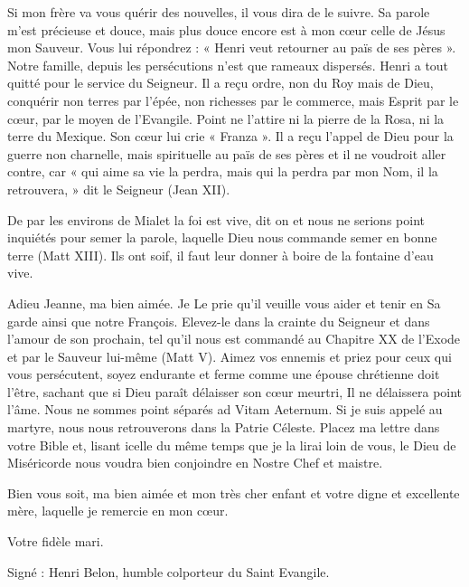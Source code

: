 {Si mon frère va vous quérir des nouvelles, il vous dira de le suivre. Sa parole m’est précieuse et douce, mais plus douce encore est à mon cœur celle de Jésus mon Sauveur. Vous lui répondrez : « Henri veut retourner au païs de ses pères ». Notre famille, depuis les persécutions n’est que rameaux dispersés. Henri a tout quitté pour le service du Seigneur. Il a reçu ordre, non du Roy mais de Dieu, conquérir non terres par l’épée, non richesses par le commerce, mais Esprit par le cœur, par le moyen de l’Evangile. Point ne l’attire ni la pierre de la Rosa, ni la terre du Mexique. Son cœur lui crie « Franza ». Il a reçu l’appel de Dieu pour la guerre non charnelle, mais spirituelle au païs de ses pères et il ne voudroit aller contre, car « qui aime sa vie la perdra, mais qui la perdra par mon Nom, il la retrouvera, » dit le Seigneur (Jean XII).

De par les environs de Mialet la foi est vive, dit on et nous ne serions point inquiétés pour semer la parole, laquelle Dieu nous commande semer en bonne terre (Matt XIII). Ils ont soif, il faut leur donner à boire de la fontaine d’eau vive.

Adieu Jeanne, ma bien aimée. Je Le prie qu’il veuille vous aider et tenir en Sa garde ainsi que notre François. Elevez-le dans la crainte du Seigneur et dans l’amour de son prochain, tel qu’il nous est commandé au Chapitre XX de l’Exode et par le Sauveur lui-même (Matt V). Aimez vos ennemis et priez pour ceux qui vous persécutent, soyez endurante et ferme comme une épouse chrétienne doit l’être, sachant que si Dieu paraît délaisser son cœur meurtri, Il ne délaissera point l’âme. Nous ne sommes point séparés ad Vitam Aeternum. Si je suis appelé au martyre, nous nous retrouverons dans la Patrie Céleste. Placez ma lettre dans votre Bible et, lisant icelle du même temps que je la lirai loin de vous, le Dieu de Miséricorde nous voudra bien conjoindre en Nostre Chef et maistre.

Bien vous soit, ma bien aimée et mon très cher enfant et votre digne et excellente mère, laquelle je remercie en mon cœur.

\begin{center}
Votre fidèle mari.
\end{center}

Signé : Henri Belon, humble colporteur du Saint Evangile.

\vspace{0.2em}

}
